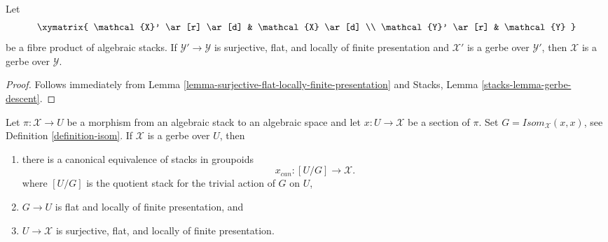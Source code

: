 \begin{lemma}
\label{lemma-gerbe-descent}
Let
$$
\xymatrix{
\mathcal{X}' \ar[r] \ar[d] & \mathcal{X} \ar[d] \\
\mathcal{Y}' \ar[r] & \mathcal{Y}
}
$$
be a fibre product of algebraic stacks.
If $\mathcal{Y}' \to \mathcal{Y}$ is surjective, flat, and locally
of finite presentation and $\mathcal{X}'$ is a gerbe over $\mathcal{Y}'$,
then $\mathcal{X}$ is a gerbe over $\mathcal{Y}$.
\end{lemma}

\begin{proof}
Follows immediately from
Lemma \ref{lemma-surjective-flat-locally-finite-presentation}
and
Stacks, Lemma \ref{stacks-lemma-gerbe-descent}.
\end{proof}

\begin{lemma}
\label{lemma-gerbe-with-section}
Let $\pi : \mathcal{X} \to U$ be a morphism from an algebraic stack to
an algebraic space and let $x : U \to \mathcal{X}$ be a section of $\pi$.
Set $G = \mathit{Isom}_\mathcal{X}(x, x)$, see
Definition \ref{definition-isom}.
If $\mathcal{X}$ is a gerbe over $U$, then
\begin{enumerate}
\item there is a canonical equivalence of stacks in groupoids
$$
x_{can} : [U/G] \longrightarrow \mathcal{X}.
$$
where $[U/G]$ is the quotient stack for the trivial
action of $G$ on $U$,
\item $G \to U$ is flat and locally of finite presentation, and
\item $U \to \mathcal{X}$ is surjective, flat, and locally of finite
presentation.
\end{enumerate}
\end{lemma}


